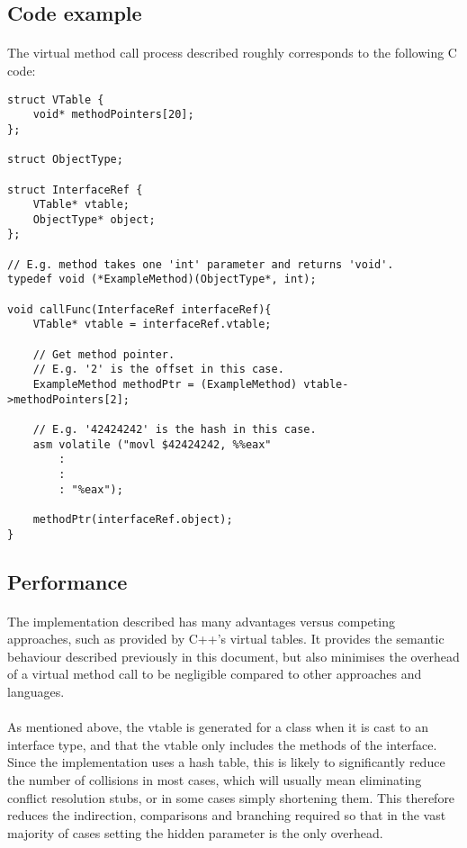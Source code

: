 \documentclass[12pt,twoside,notitlepage]{report}
\begin{document}
\subsection{Code example}

\paragraph{}
The virtual method call process described roughly corresponds to the following C code:

\begin{lstlisting}
struct VTable {
	void* methodPointers[20];
};

struct ObjectType;

struct InterfaceRef {
	VTable* vtable;
	ObjectType* object;
};

// E.g. method takes one 'int' parameter and returns 'void'.
typedef void (*ExampleMethod)(ObjectType*, int);

void callFunc(InterfaceRef interfaceRef){
	VTable* vtable = interfaceRef.vtable;	
	
	// Get method pointer.
	// E.g. '2' is the offset in this case.
	ExampleMethod methodPtr = (ExampleMethod) vtable->methodPointers[2];
	
	// E.g. '42424242' is the hash in this case.
	asm volatile ("movl $42424242, %%eax"
		:
		:
		: "%eax");
	
	methodPtr(interfaceRef.object);
}
\end{lstlisting}

\subsection{Performance}

\paragraph{}
The implementation described has many advantages versus competing approaches, such as provided by C++'s virtual tables. It provides the semantic behaviour described previously in this document, but also minimises the overhead of a virtual method call to be negligible compared to other approaches and languages.

\paragraph{}
As mentioned above, the vtable is generated for a class when it is cast to an interface type, and that the vtable only includes the methods of the interface. Since the implementation uses a hash table, this is likely to significantly reduce the number of collisions in most cases, which will usually mean eliminating conflict resolution stubs, or in some cases simply shortening them. This therefore reduces the indirection, comparisons and branching required so that in the vast majority of cases setting the hidden parameter is the only overhead.
\end{document}
